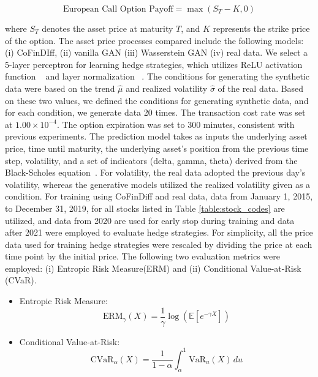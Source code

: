 \documentclass{article}
\begin{document}
\begin{equation}
  \text{European Call Option Payoff} = \max(S_T - K, 0)
\end{equation}

where $S_T$ denotes the asset price at maturity $T$, and $K$ represents the strike price of the option.
The asset price processes compared include the following models: (i) CoFinDIff, (ii) vanilla GAN (iii) Wasserstein GAN (iv) real data. We select a 5-layer perceptron for learning hedge strategies, which utilizes ReLU activation function ~\cite{nair2010rectified} and layer normalization ~\cite{ba2016layer}.
The conditions for generating the synthetic data were based on the trend $\hat{\mu}$ and realized volatility $\hat{\sigma}$ of the real data. Based on these two values, we defined the conditions for generating synthetic data, and for each condition, we generate data 20 times.
The transaction cost rate was set at $1.00 \times 10^{-4}$. 
The option expiration was set to 300 minutes, consistent with previous experiments.
The prediction model takes as inputs the underlying asset price, time until maturity, the underlying asset’s position from the previous time step, volatility, and a set of indicators (delta, gamma, theta) derived from the Black-Scholes equation~\cite{black1973pricing}. For volatility, the real data adopted the previous day’s volatility, whereas the generative models utilized the realized volatility given as a condition.
For training using CoFinDiff and real data, data from January 1, 2015, to December 31, 2019, for all stocks listed in Table \ref{table:stock_codes} are utilized, and data from 2020 are used for early stop during training and data after 2021 were employed to evaluate hedge strategies.
For simplicity, all the price data used for training hedge strategies were rescaled by dividing the price at each time point by the initial price. The following two evaluation metrics were employed: (i) Entropic Risk Measure(ERM) and (ii) Conditional Value-at-Risk (CVaR).

\begin{itemize}
    \item Entropic Risk Measure:
    \begin{equation}
    \text{ERM}_{\gamma}(X) = \frac{1}{\gamma} \log \left( \mathbb{E}\left[ e^{- \gamma X} \right] \right)
    \end{equation}
    
    \item Conditional Value-at-Risk:
    \begin{equation}
    \text{CVaR}_{\alpha}(X) = \frac{1}{1-\alpha} \int_{\alpha}^{1} \text{VaR}_{u}(X) \, du
    \end{equation}
\end{itemize}
\end{document}

